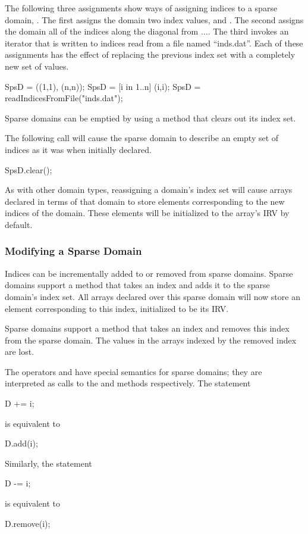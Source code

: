 \begin{example}
The following three assignments show ways of assigning indices to a
sparse domain, .  The first assigns the domain two index
values,  and .  The second assigns the domain
all of the indices along the diagonal from
$\ldots$.  The third invokes an iterator that
is written to  indices read from a file named
``inds.dat''.  Each of these assignments has the effect of replacing
the previous index set with a completely new set of values.
\begin{chapel}
SpsD = ((1,1), (n,n));
SpsD = [i in 1..n] (i,i);
SpsD = readIndicesFromFile("inds.dat");
\end{chapel}
\end{example}

Sparse domains can be emptied by using a method  that
clears out its index set.

\begin{example}
The following call will cause the sparse domain  to
describe an empty set of indices as it was when initially declared.
\begin{chapel}
SpsD.clear();
\end{chapel}
\end{example}

As with other domain types, reassigning a domain's index set will
cause arrays declared in terms of that domain to store elements
corresponding to the new indices of the domain.  These elements will
be initialized to the array's IRV by default.



\subsubsection{Modifying a Sparse Domain}

Indices can be incrementally added to or removed from sparse domains.
Sparse domains support a method  that takes an index and
adds it to the sparse domain's index set.  All arrays declared over
this sparse domain will now store an element corresponding to this
index, initialized to be its IRV.

Sparse domains support a method  that takes an index and
removes this index from the sparse domain.  The values in the arrays
indexed by the removed index are lost.

The operators \chpl{+=} and \chpl{-=} have special semantics for
sparse domains; they are interpreted as calls to the 
and  methods respectively.  The statement
\begin{chapel}
D += i;
\end{chapel}
is equivalent to
\begin{chapel}
D.add(i);
\end{chapel}
Similarly, the statement
\begin{chapel}
D -= i;
\end{chapel}
is equivalent to
\begin{chapel}
D.remove(i);
\end{chapel}


